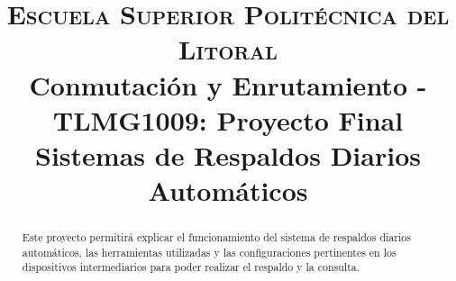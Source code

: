 \documentclass[conference]{IEEEtran}
\begin{document}
\title{
{\large \textsc{Escuela Superior Politécnica del Litoral}\\
Conmutación y Enrutamiento - TLMG1009: Proyecto Final
}\\
Sistemas de Respaldos Diarios Automáticos\\
}

\author{
\and
{}
\and
{}
\and
{}
\and
{}
}


\maketitle

\begin{abstract}
	Este proyecto permitirá explicar el funcionamiento del sistema de respaldos diarios automáticos, las herramientas utilizadas y las configuraciones pertinentes en los dispositivos intermediarios para poder realizar el respaldo y la consulta.
\end{abstract}
\end{document}
